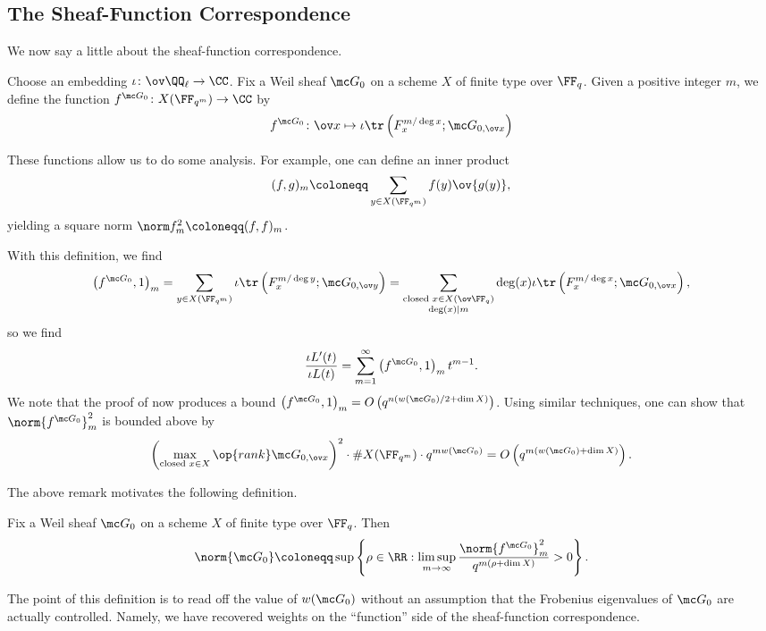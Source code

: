 \documentclass[../notes.tex]{subfiles}
\begin{document}
\subsection{The Sheaf-Function Correspondence}
We now say a little about the sheaf-function correspondence.
\begin{definition}
	Choose an embedding $\iota\colon\ov\QQ_\ell\to\CC$. Fix a Weil sheaf $\mc G_0$ on a scheme $X$ of finite type over $\FF_q$. Given a positive integer $m$, we define the function $f^{\mc G_0}\colon X(\FF_{q^m})\to\CC$ by
	\[f^{\mc G_0}\colon\ov x\mapsto\iota\tr\left(F_x^{m/\deg x};\mc G_{0,\ov x}\right)\]
\end{definition}
These functions allow us to do some analysis. For example, one can define an inner product
\[(f,g)_m\coloneqq\sum_{y\in X(\FF_{q^m})}f(y)\ov{g(y)},\]
yielding a square norm $\norm f_m^2\coloneqq(f,f)_m$.
\begin{remark}
	With this definition, we find
	\[\left(f^{\mc G_0},1\right)_m=\sum_{y\in X(\FF_{q^m})}\iota\tr\left(F_x^{m/\deg y};\mc G_{0,\ov y}\right)=\sum_{\substack{\text{closed }x\in X(\ov\FF_q)\\\deg (x)\mid m}}\deg(x)\iota\tr\left(F_x^{m/\deg x};\mc G_{0,\ov x}\right),\]
	so we find
	\[\frac{\iota L'(t)}{\iota L(t)}=\sum_{m=1}^\infty\left(f^{\mc G_0},1\right)_mt^{m-1}.\]
	We note that the proof of  now produces a bound $\left(f^{\mc G_0},1\right)_m=O\left(q^{n(w(\mc G_0)/2+\dim X)}\right)$. Using similar techniques, one can show that $\norm {f^{\mc G_0}}_m^2$ is bounded above by
	\[\left(\max_{\text{closed }x\in X}\op{rank}\mc G_{0,\ov x}\right)^2\cdot\#X(\FF_{q^m})\cdot q^{mw(\mc G_0)}=O\left(q^{m(w(\mc G_0)+\dim X)}\right).\]
\end{remark}
The above remark motivates the following definition.
\begin{definition}
	Fix a Weil sheaf $\mc G_0$ on a scheme $X$ of finite type over $\FF_q$. Then
	\[\norm{\mc G_0}\coloneqq\sup\left\{\rho\in\RR:\limsup_{m\to\infty}\frac{\norm{f^{\mc G_0}}_m^2}{q^{m(\rho+\dim X)}}>0\right\}.\]
\end{definition}
The point of this definition is to read off the value of $w(\mc G_0)$ without an assumption that the Frobenius eigenvalues of $\mc G_0$ are actually controlled. Namely, we have recovered weights on the ``function'' side of the sheaf-function correspondence.
\end{document}
